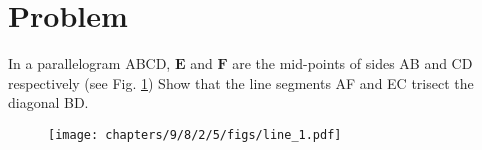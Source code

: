 \documentclass[10pt, a4paper]{article}
\title{\mytitle}
\author{\myauthor\hspace{1em}\\\contact\\FWC22012\hspace{6.5em}IITH\hspace{0.5em}\mymodule\hspace{6em}ASSIGN-5}
\date{}
\let\vec\mathbf
\begin{document}
	\maketitle
	\tableofcontents
   \section{Problem}
   \fi
 In a parallelogram ABCD, $\vec{E}$ and $\vec{F}$ are the
mid-points of sides AB and CD respectively
(see Fig. 
		\ref{fig:9/8/2/5})
Show that the line segments AF
and EC trisect the diagonal BD.

 	\begin{figure}
		\centering
 \texttt{[image: chapters/9/8/2/5/figs/line\_1.pdf]}
		\caption{}
		\label{fig:9/8/2/5}
  	\end{figure}

	\iffalse
\end{document}
